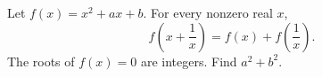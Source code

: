 Let $f(x)=x^2+ax+b$. For every nonzero real $x$,
\[f\left(x+\dfrac{1}{x}\right)=f(x)+f\left(\dfrac{1}{x}\right).\]
The roots of $f(x)=0$ are integers. Find $a^2+b^2$.
